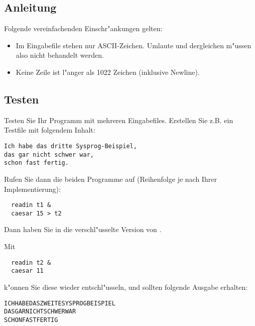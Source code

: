 \subsection*{Anleitung}
Folgende vereinfachenden Einschr"ankungen gelten:
\begin{itemize}
\item Im Eingabefile stehen nur ASCII-Zeichen. Umlaute und dergleichen
m"ussen also nicht behandelt werden.
\item Keine Zeile ist l"anger als 1022 Zeichen (inklusive Newline).
\end{itemize}




\subsection*{Testen}
Testen Sie Ihr Programm mit mehreren Eingabefiles. 
Erstellen Sie z.B. ein Testfile  mit folgendem Inhalt: 
\begin{verbatim}
Ich habe das dritte Sysprog-Beispiel,
das gar nicht schwer war,
schon fast fertig.
\end{verbatim}
Rufen Sie dann die beiden Programme auf (Reihenfolge je nach Ihrer
Implementierung):
\begin{verbatim}
  readin t1 &
  caesar 15 > t2
\end{verbatim}
Dann haben Sie in  die verschl"usselte Version von .

Mit
\begin{verbatim}
  readin t2 &
  caesar 11
\end{verbatim}
k"onnen Sie diese wieder entschl"usseln, und sollten folgende Ausgabe
erhalten:
\begin{verbatim}
ICHHABEDASZWEITESYSPROGBEISPIEL
DASGARNICHTSCHWERWAR
SCHONFASTFERTIG
\end{verbatim}

\osueguidelinesthree



